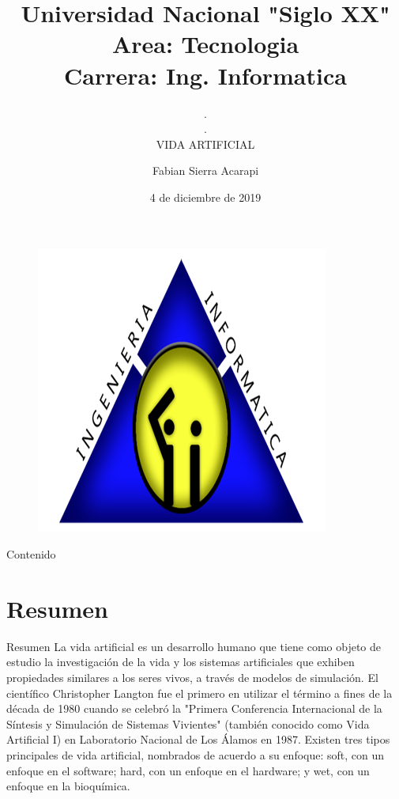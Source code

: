 \documentclass[11pt]{beamer}
\author{Fabian Sierra Acarapi}
\title[Vida Artificial]{Universidad Nacional "Siglo XX"\\Area: Tecnologia\\Carrera: Ing. Informatica}
\date{4 de diciembre de 2019}
\subtitle{.\\.\\VIDA ARTIFICIAL}
\begin{document}
\begin{frame}

\titlepage
		\begin{figure}
			
			\includegraphics[scale=0.2]{informatica.png}
			
		\end{figure}

\end{frame}


\begin{frame}{Contenido}

	\tableofcontents
\end{frame}



\section{Resumen}
	\begin{frame}{Resumen}
		\justify
		La vida artificial es un desarrollo humano que tiene como objeto de estudio la 			        investigación de la vida y los sistemas artificiales que exhiben propiedades similares                  		a los seres vivos, a través de modelos de simulación. El científico Christopher Langton 		fue el primero en utilizar el término a fines de la década de 1980 cuando se celebró la 		"Primera Conferencia Internacional de la Síntesis y Simulación de Sistemas Vivientes" 			(también conocido como Vida Artificial I) en Laboratorio Nacional de Los Álamos en 				1987. Existen tres tipos principales de vida artificial, nombrados de acuerdo a su 				enfoque: soft, con un enfoque en el software; hard, con un enfoque en el hardware; y 			wet, con un enfoque en la bioquímica.		
			
	
	\end{frame}
\end{document}

